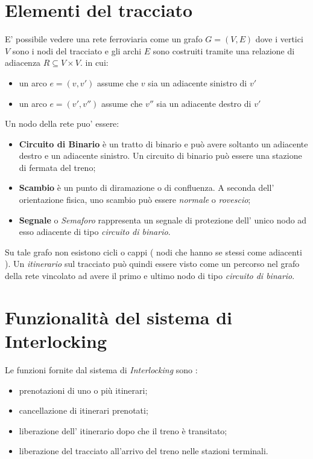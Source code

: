 \documentclass[10pt,a4paper,oneside]{report}
\begin{document}
\section{Elementi del tracciato} 
E' possibile vedere una rete ferroviaria come un grafo $G =(V,E) $ dove i vertici $V$ sono i nodi del tracciato e gli archi $E$ sono costruiti tramite una relazione di adiacenza $R \subseteq V \times V$. in cui:
\begin{itemize}
\item un arco $e=(v,v')$ assume che $v$ sia un adiacente sinistro di $v'$ 
\item un arco $e=(v',v'')$ assume che $v''$ sia un adiacente destro di $v'$ 
\end{itemize}
Un nodo della rete puo' essere:
\begin{itemize}
\item \textbf{Circuito di Binario} è un tratto di binario e può avere soltanto un adiacente destro e un adiacente sinistro. Un circuito di binario può essere una stazione di fermata del treno;
\item \textbf{Scambio} è un punto di diramazione o di confluenza. A seconda dell' orientazione fisica, uno scambio può essere \textit{normale} o \textit{rovescio}; 
\item \textbf{Segnale} o \emph{Semaforo} rappresenta un segnale di protezione dell' unico nodo ad esso adiacente di tipo \emph{circuito di binario}.
\end{itemize}
Su tale grafo non esistono cicli o cappi ( nodi che hanno se stessi come adiacenti ).
Un \emph{itinerario} sul tracciato può quindi essere visto come un percorso nel grafo della rete vincolato ad avere il primo e ultimo nodo di tipo \emph{circuito di binario}.
\section{Funzionalità del sistema di Interlocking}
Le funzioni fornite dal sistema di \emph{Interlocking} sono :
\begin{itemize}
\item prenotazioni di uno o più itinerari;
\item cancellazione di itinerari prenotati;
\item liberazione dell' itinerario dopo che il treno è transitato; 
\item liberazione del tracciato all'arrivo del treno nelle stazioni terminali.
\end{itemize} 
\end{document}
